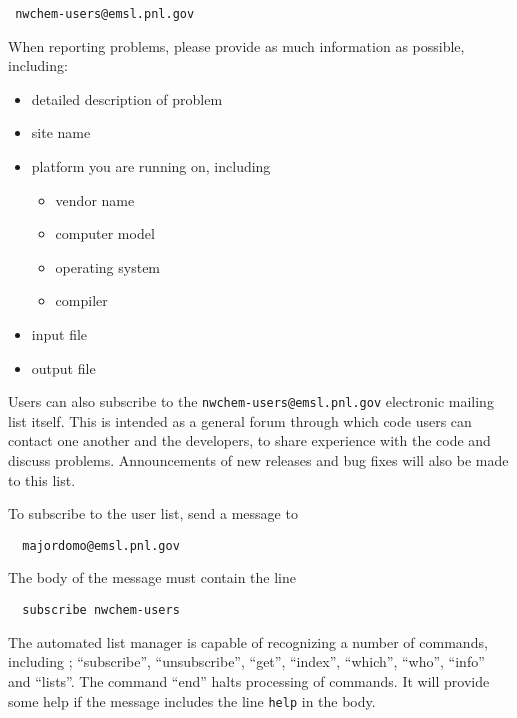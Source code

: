 \begin{verbatim}
 nwchem-users@emsl.pnl.gov
\end{verbatim}

When reporting problems, please provide as much information as possible, 
including:

\begin{itemize}
\item detailed description of problem
\item site name %
\item platform you are running on, including
\begin{itemize}
\item vendor name
\item computer model
\item operating system
\item compiler
\end{itemize}
\item input file
\item output file
\end{itemize}

Users can also subscribe to the {\tt nwchem-users@emsl.pnl.gov}
electronic mailing list itself.  
This is intended as a general forum through which code
users can contact one another and the developers, to share experience
with the code and discuss problems.  Announcements of new releases and
bug fixes will also be made to this list. 

To subscribe to the user list, send a message to 
\begin{verbatim}
  majordomo@emsl.pnl.gov
\end{verbatim}
The body of the message must contain the line 
\begin{verbatim}
  subscribe nwchem-users
\end{verbatim}

The automated list manager is capable of recognizing a number of
commands, including ; ``subscribe'', ``unsubscribe'', ``get'', ``index'',
``which'', ``who'', ``info'' and ``lists''.  The command ``end'' halts
processing of commands.  It will provide some help if the message
includes the line {\tt help} in the body.  




